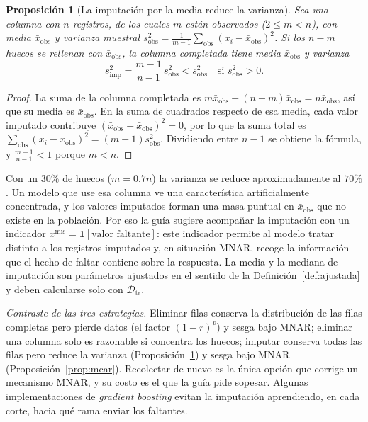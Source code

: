 \documentclass[11pt]{article}
\newtheorem{proposicion}[teorema]{Proposición}
\theoremstyle{definition}
\theoremstyle{remark}
\newcommand{\ind}[1]{\mathbf{1}\!\left[#1\right]}
\newcommand{\Dtr}{\mathcal{D}_{\mathrm{tr}}}
\begin{document}
\begin{proposicion}[La imputación por la media reduce la varianza]\label{prop:imput-var}
\noindent Sea una columna con $n$ registros, de los cuales $m$ están observados ($2\le m<n$), con media $\bar x_{\mathrm{obs}}$ y varianza muestral $s^2_{\mathrm{obs}}=\frac{1}{m-1}\sum_{\mathrm{obs}}(x_i-\bar x_{\mathrm{obs}})^2$. Si los $n-m$ huecos se rellenan con $\bar x_{\mathrm{obs}}$, la columna completada tiene media $\bar x_{\mathrm{obs}}$ y varianza
\[
s^2_{\mathrm{imp}}=\frac{m-1}{n-1}\,s^2_{\mathrm{obs}}<s^2_{\mathrm{obs}}\quad\text{si }s^2_{\mathrm{obs}}>0.
\]
\end{proposicion}
\begin{proof}
\noindent La suma de la columna completada es $m\bar x_{\mathrm{obs}}+(n-m)\bar x_{\mathrm{obs}}=n\bar x_{\mathrm{obs}}$, así que su media es $\bar x_{\mathrm{obs}}$. En la suma de cuadrados respecto de esa media, cada valor imputado contribuye $(\bar x_{\mathrm{obs}}-\bar x_{\mathrm{obs}})^2=0$, por lo que la suma total es $\sum_{\mathrm{obs}}(x_i-\bar x_{\mathrm{obs}})^2=(m-1)s^2_{\mathrm{obs}}$. Dividiendo entre $n-1$ se obtiene la fórmula, y $\frac{m-1}{n-1}<1$ porque $m<n$.
\end{proof}

\noindent Con un $30\%$ de huecos ($m=0.7n$) la varianza se reduce aproximadamente al $70\%$. Un modelo que use esa columna ve una característica artificialmente concentrada, y los valores imputados forman una masa puntual en $\bar x_{\mathrm{obs}}$ que no existe en la población. Por eso la guía sugiere acompañar la imputación con un indicador $x^{\mathrm{mis}}=\ind{\text{valor faltante}}$: este indicador permite al modelo tratar distinto a los registros imputados y, en situación MNAR, recoge la información que el hecho de faltar contiene sobre la respuesta. La media y la mediana de imputación son parámetros ajustados en el sentido de la Definición~\ref{def:ajustada} y deben calcularse solo con $\Dtr$.

\medskip

\noindent \emph{Contraste de las tres estrategias.} Eliminar filas conserva la distribución de las filas completas pero pierde datos (el factor $(1-r)^p$) y sesga bajo MNAR; eliminar una columna solo es razonable si concentra los huecos; imputar conserva todas las filas pero reduce la varianza (Proposición~\ref{prop:imput-var}) y sesga bajo MNAR (Proposición~\ref{prop:mcar}). Recolectar de nuevo es la única opción que corrige un mecanismo MNAR, y su costo es el que la guía pide sopesar. Algunas implementaciones de \emph{gradient boosting} evitan la imputación aprendiendo, en cada corte, hacia qué rama enviar los faltantes.
\end{document}
